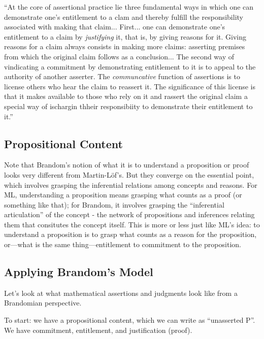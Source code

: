 ``At the core of assertional practice lie three fundamental ways in
which one can demonstrate one's entitlement to a clam and thereby
fulfill the responsibility associated with making that
claim... First... one can demonstrate one's entitlement to a claim by
\textit{justifying} it, that is, by giving reasons for it.  Giving
reasons for a claim always consists in making more claims: asserting
premises from which the original claim follows as a conclusion... The
second way of vindicating a commitment by demonstrating entitlement to
it is to appeal to the authority of another asserter.  The
\textit{communcative} function of assertions is to license others who
hear the claim to reassert it.  The significance of this license is
that it makes available to those who rely on it and rassert the
original claim a special way of ischargin thheir responsibiity to
demonstrate their entitlement to it.''\citep[174; the third way
involves invoking one's own authority as a reliable noninferential
reporter, which is discussed later in MIE.]{brandom_making_1998}

\subsection{Propositional Content}
\label{subs:}

Note that Brandom's notion of what it is to understand a proposition
or proof looks very different from Martin-L\"{o}f's.  But they
converge on the essential point, which involves grasping the
inferential relations among concepts and reasons.  For ML,
understanding a proposition means grasping what counts as a proof (or
something like that); for Brandom, it involves grasping the
``inferential articulation'' of the concept - the network of
propositions and inferences relating them that consitutes the concept
itself.  This is more or less just like ML's idea: to understand a
proposition is to grasp what counts as a reason for the proposition,
or---what is the same thing---entitlement to commitment to the
proposition.

\subsection{Applying Brandom's Model}
\label{subs:bapply}

Let's look at what mathematical assertions and judgments look like
from a Brandomian perspective.

To start: we have a propositional content, which we can write as
``unasserted P''.  We have commitment, entitlement, and justification
(proof).

